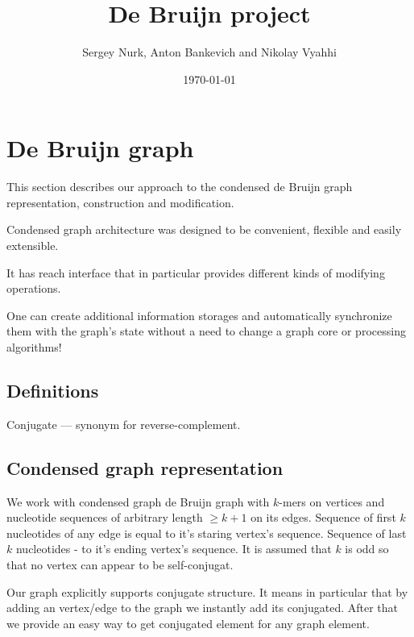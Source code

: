 \documentclass[12pt]{article}
\title{De Bruijn project}
\author{Sergey Nurk, Anton Bankevich and Nikolay Vyahhi}
\date{\today}
\newcommand{\dbg}{de Bruijn graph}
\begin{document}
\maketitle

\tableofcontents

\section{De Bruijn graph}

This section describes our approach to the condensed \dbg{} representation, construction and modification.

Condensed graph architecture was designed to be convenient, flexible and easily extensible. 

It has reach interface that in particular provides different kinds of modifying operations. 

One can create additional information storages and automatically synchronize them with the graph's state without a need to change a graph core or processing algorithms!


\subsection{Definitions}

Conjugate --- synonym for reverse-complement.

\subsection{Condensed graph representation}

We work with condensed graph \dbg{} with $k$-mers on vertices and nucleotide sequences of arbitrary length $\geq k + 1$ on its edges. Sequence of first $k$ nucleotides of any edge is equal to it's staring vertex's sequence. Sequence of last $k$ nucleotides - to it's ending vertex's sequence. It is assumed that $k$ is odd so that no vertex can appear to be self-conjugat.

Our graph explicitly supports conjugate structure. It means in particular that by adding an vertex/edge to the graph we instantly add its conjugated. After that we provide an easy way to get conjugated element for any graph element.
\end{document}
